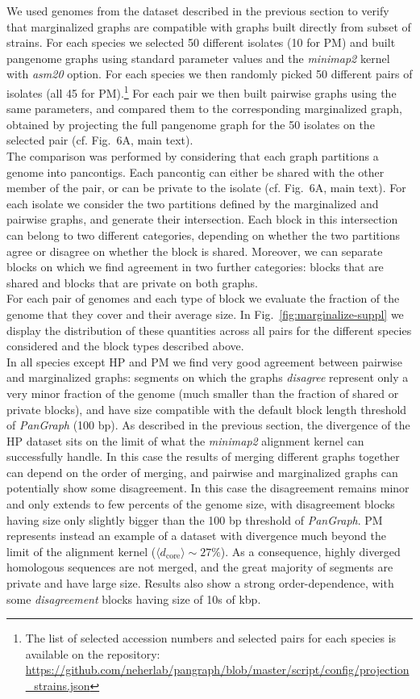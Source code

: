 \documentclass[aps,rmp,reprint,superscriptaddress,notitlepage,10pt,onecolumn]{revtex4-1}
\newcommand{\dcore}{\langle d_\text{core} \rangle}
\begin{document}
We used genomes from the dataset described in the previous section to verify that marginalized graphs are compatible with graphs built directly from subset of strains. For each species we selected 50 different isolates (10 for PM) and built pangenome graphs using standard parameter values and the \textit{minimap2} kernel with \textit{asm20} option. For each species we then randomly picked 50 different pairs of isolates (all 45 for PM).\footnote{The list of selected accession numbers and selected pairs for each species is available on the repository: \url{https://github.com/neherlab/pangraph/blob/master/script/config/projection_strains.json}} For each pair we then built pairwise graphs using the same parameters, and compared them to the corresponding marginalized graph, obtained by projecting the full pangenome graph for the 50 isolates on the selected pair (cf. Fig.~6A, main text).\\
The comparison was performed by considering that each graph partitions a genome into pancontigs. Each pancontig can either be shared with the other member of the pair, or can be private to the isolate (cf. Fig.~6A, main text). For each isolate we consider the two partitions defined by the marginalized and pairwise graphs, and generate their intersection. Each block in this intersection can belong to two different categories, depending on whether the two partitions agree or disagree on whether the block is shared. Moreover, we can separate blocks on which we find agreement in two further categories: blocks that are shared and blocks that are private on both graphs.\\
For each pair of genomes and each type of block we evaluate the fraction of the genome that they cover and their average size. In Fig.~\ref{fig:marginalize-suppl} we display the distribution of these quantities across all pairs for the different species considered and the block types described above.\\
In all species except HP and PM we find very good agreement between pairwise and marginalized graphs: segments on which the graphs \textit{disagree} represent only a very minor fraction of the genome (much smaller than the fraction of shared or private blocks), and have size compatible with the default block length threshold of \textit{PanGraph} (100 bp).
As described in the previous section, the divergence of the HP dataset sits on the limit of what the \textit{minimap2} alignment kernel can successfully handle. In this case the results of merging different graphs together can depend on the order of merging, and pairwise and marginalized graphs can potentially show some disagreement. In this case the disagreement remains minor and only extends to few percents of the genome size, with disagreement blocks having size only slightly bigger than the 100 bp threshold of \textit{PanGraph}.
PM represents instead an example of a dataset with divergence much beyond the limit of the alignment kernel ($\dcore \sim 27 \%$). As a consequence, highly diverged homologous sequences are not merged, and the great majority of segments are private and have large size. Results also show a strong order-dependence, with some \textit{disagreement} blocks having size of 10s of kbp.
\end{document}
